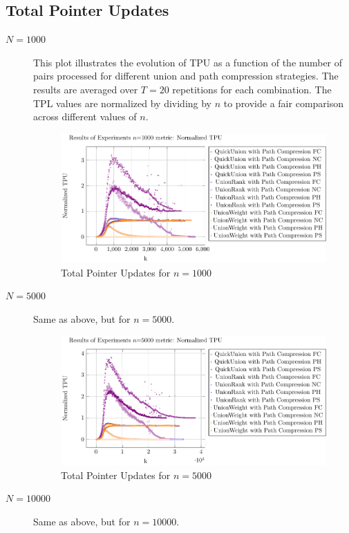 \documentclass[10pt,a4paper,hidelinks]{article}
\begin{document}
\subsection{Total Pointer Updates}
\begin{description}
    \item[$N = 1000$] This plot illustrates the evolution of TPU as a function of the number of pairs processed for different union and path compression strategies. The results are averaged over $T=20$ repetitions for each combination. The TPL values are normalized by dividing by $n$ to provide a fair comparison across different values of $n$.
    \begin{figure}[h]
        \centering
        \includegraphics[width=\linewidth]{plots/plot_1000_Normalized TPU.pdf}
        \caption{Total Pointer Updates for $n = 1000$}
    \end{figure}
    \item[$N = 5000$] Same as above, but for $n = 5000$.
    \begin{figure}[h]
        \centering
        \includegraphics[width=\linewidth]{plots/plot_5000_Normalized TPU.pdf}
        \caption{Total Pointer Updates for $n = 5000$}
    \end{figure}
    \item[$N = 10000$] Same as above, but for $n = 10000$.

\end{description}
\end{document}
